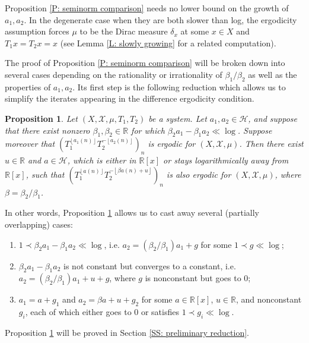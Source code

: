 \documentclass[11pt]{amsart}
\newtheorem{proposition}[lemma]{Proposition}
\theoremstyle{definition}
\newcommand{\R}{{\mathbb R}}
\newcommand{\CH}{{\mathcal H}}
\newcommand{\CX}{{\mathcal X}}
\newcommand{\1}{{\mathbf{1}}}
\newcommand{\floor}[1]{{\left \lfloor #1 \right \rfloor}}
\begin{document}
Proposition \ref{P: seminorm comparison} needs no lower bound on the growth of $a_1, a_2$. In the degenerate case when they are both slower than log, the ergodicity assumption forces $\mu$ to be the Dirac measure $\delta_x$ at some $x\in X$ and $T_1 x = T_2 x = x$ (see Lemma \ref{L: slowly growing} for a related computation).

The proof of Proposition \ref{P: seminorm comparison} will be broken down into several cases depending on the rationality or irrationality of $\beta_1/\beta_2$ as well as the properties of $a_1, a_2$. Its first step is the following reduction which allows us to simplify the iterates appearing in the difference ergodicity condition.
\begin{proposition}\label{P: reduction of ergodicity}
    Let $(X, \CX, \mu, T_1, T_2)$ be a system. Let $a_1, a_2\in\CH$,
    and suppose that there exist nonzero $\beta_1, \beta_2\in\R$ for which $\beta_2 a_1 - \beta_1 a_2 \ll \log$. Suppose moreover that $(T_1^{\floor{a_1(n)}}T_2^{-\floor{a_2(n)}})_n$ is ergodic for $(X, \CX, \mu)$. 
    Then there exist $u\in\R$ and $a\in \CH$, which is either in $\R[x]$ or stays logarithmically away from $\R[x]$, such that $(T_1^{\floor{{a}(n)}}T_2^{-\floor{\beta{a}(n)+u}})_n$ is also ergodic for $(X, \CX, \mu)$, where $\beta = \beta_2/\beta_1$. 
\end{proposition}

In other words, Proposition \ref{P: reduction of ergodicity} allows us to cast away several (partially overlapping) cases: 
\begin{enumerate}
    \item $1\prec \beta_2 a_1 - \beta_1 a_2 \ll \log$, i.e. $a_2 = (\beta_2/\beta_1)a_1 + g$ for some $1\prec g \ll \log$;
    \item $\beta_2 a_1 - \beta_1 a_2$ is not constant but converges to a constant, i.e. $a_2 = (\beta_2/\beta_1)a_1 + u + g$, where $g$ is nonconstant but goes to 0;
    \item $a_1 = a + g_1$ and $a_2 = \beta a + u + g_2$ for some $a\in\R[x]$, $u\in\R$, and nonconstant $g_i$, each of which either goes to 0 or satisfies $1\prec g_i\ll \log$.
\end{enumerate}


Proposition \ref{P: reduction of ergodicity} will be proved in Section \ref{SS: preliminary reduction}.
\end{document}
